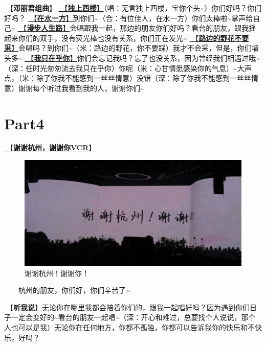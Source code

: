 \documentclass[]{ctexbook}
\begin{document}
🎵【\textbf{邓丽君组曲}】
\hyperref[one-in-the-building]{🎵【\textbf{独上西楼}】}（唱：无言独上西楼，宝你个头\textasciitilde）你们好吗？你们好吗？
\hyperref[on-the-water-side]{🎵【\textbf{在水一方}】}到你们\textasciitilde（合：有位佳人，在水一方）你们太棒啦\textasciitilde 掌声给自己\textasciitilde{}
\hyperref[walk-the-road-of-life]{🎵【\textbf{漫步人生路}】}会唱跟我一起，那边的朋友你们好吗？看台的朋友，跟我摇起来你们的双手，没有荧光棒也没有关系，你们正在发光\textasciitilde{}
\hyperref[only-with-me]{🎵【\textbf{路边的野花不要采}】}会唱吗？到你们\textasciitilde（米：路边的野花，你不要踩）我才不会采，但是，你们墙头多\textasciitilde{}
\hyperref[only-you]{🎵【\textbf{我只在乎你}】}你们会忘记我吗？忘了也没关系，因为曾经我们相遇过哦\textasciitilde（深：任时光匆匆流去我只在乎你）你呢（米：心甘情愿感染你的气息）\textasciitilde 大声点，（米：除了你我不能感到一丝丝情意）没错（深：除了你我不能感到一丝丝情意）谢谢每个听过我看到我的人，谢谢你们\textasciitilde{}

\section{Part4}\label{hangzhou-20240824-part4}

\hyperref[thank-you-vcr]{🎥【\textbf{谢谢杭州，谢谢你VCR}】}

\begin{figure}

{\centering \includegraphics[width=350pt]{img/hangzhou20240824/thank-hangzhou} 

}

\caption{谢谢杭州！谢谢你！}\label{fig:unnamed-chunk-85}
\end{figure}

  杭州的朋友，你们好，你们辛苦了\textasciitilde{}

\hyperref[listen-to-me]{🎵【\textbf{听我说}】}无论你在哪里我都会陪着你们的，跟我一起唱好吗？因为遇到你们日子一定会变好的\textasciitilde 看台的朋友一起唱\textasciitilde（深：开心和难过，总要找个人说说，那个人也可以是我）无论你在任何地方，你都不孤独，你都可以告诉我你的快乐和不快乐，好吗？
\end{document}
